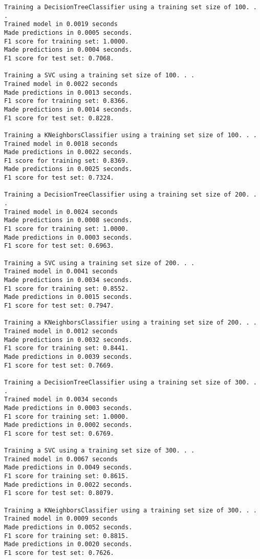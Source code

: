 \documentclass{ctexart}
\begin{document}
    \begin{Verbatim}[commandchars=\\\{\}]
Training a DecisionTreeClassifier using a training set size of 100. . .
Trained model in 0.0019 seconds
Made predictions in 0.0005 seconds.
F1 score for training set: 1.0000.
Made predictions in 0.0004 seconds.
F1 score for test set: 0.7068.

Training a SVC using a training set size of 100. . .
Trained model in 0.0022 seconds
Made predictions in 0.0013 seconds.
F1 score for training set: 0.8366.
Made predictions in 0.0014 seconds.
F1 score for test set: 0.8228.

Training a KNeighborsClassifier using a training set size of 100. . .
Trained model in 0.0018 seconds
Made predictions in 0.0022 seconds.
F1 score for training set: 0.8369.
Made predictions in 0.0025 seconds.
F1 score for test set: 0.7324.

Training a DecisionTreeClassifier using a training set size of 200. . .
Trained model in 0.0024 seconds
Made predictions in 0.0008 seconds.
F1 score for training set: 1.0000.
Made predictions in 0.0003 seconds.
F1 score for test set: 0.6963.

Training a SVC using a training set size of 200. . .
Trained model in 0.0041 seconds
Made predictions in 0.0034 seconds.
F1 score for training set: 0.8552.
Made predictions in 0.0015 seconds.
F1 score for test set: 0.7947.

Training a KNeighborsClassifier using a training set size of 200. . .
Trained model in 0.0012 seconds
Made predictions in 0.0032 seconds.
F1 score for training set: 0.8441.
Made predictions in 0.0039 seconds.
F1 score for test set: 0.7669.

Training a DecisionTreeClassifier using a training set size of 300. . .
Trained model in 0.0034 seconds
Made predictions in 0.0003 seconds.
F1 score for training set: 1.0000.
Made predictions in 0.0002 seconds.
F1 score for test set: 0.6769.

Training a SVC using a training set size of 300. . .
Trained model in 0.0067 seconds
Made predictions in 0.0049 seconds.
F1 score for training set: 0.8615.
Made predictions in 0.0022 seconds.
F1 score for test set: 0.8079.

Training a KNeighborsClassifier using a training set size of 300. . .
Trained model in 0.0009 seconds
Made predictions in 0.0052 seconds.
F1 score for training set: 0.8815.
Made predictions in 0.0020 seconds.
F1 score for test set: 0.7626.
    \end{Verbatim}
\end{document}
